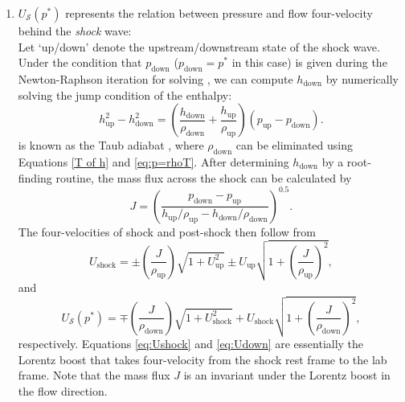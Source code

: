 \documentclass[twocolumn]{aastex63}
\begin{document}
\begin{enumerate}
\begin{enumerate}
          \item $U_{\mathscr{S}}(p^*)$ represents the relation between pressure and flow four-velocity behind the \emph{shock} wave:\\
          Let `up/down' denote the upstream/downstream state of the shock wave. Under the condition that $p_{\text{down}}$ ($p_{\text{down}}=p^{*}$ in this case) is given during the Newton-Raphson iteration for solving , we can compute $h_{\text{down}}$ by numerically solving the jump condition of the enthalpy:
          \begin{equation}
          h^2_{\text{up}}-h^2_{\text{down}}=\left(\frac{h_{\text{down}}}{\rho_{\text{down}}}+\frac{h_{\text{up}}}{\rho_{\text{up}}}\right)\left(p_{\text{up}}-p_{\text{down}}\right).
          \label{eq:TaubAdiabatic}
          \end{equation}
           is known as the Taub adiabat \citep{Taub}, where $\rho_{\text{down}}$ can be eliminated using Equations \eqref{T of h} and \eqref{eq:p=rhoT}. After determining $h_{\text{down}}$ by a root-finding routine, the mass flux across the shock can be calculated by
          \begin{equation} J=\left(\frac{p_{\text{down}}-p_{\text{up}}}{h_{\text{up}}/\rho_{\text{up}}-h_{\text{down}}/\rho_{\text{down}}}\right)^{0.5}.
          \label{eq:mass flux}
          \end{equation}
          The four-velocities of shock and post-shock then follow from
          \begin{equation}
          U_{\text{shock}}=\pm \left(\frac{J}{\rho_{\text{up}}}\right)\sqrt{1+U^2_{\text{up}}}\pm U_{\text{up}}\sqrt{1+\left(\frac{J}{\rho_{\text{up}}}\right)^2},
          \label{eq:Ushock}
          \end{equation}
          and
          \begin{equation}
          U_{\mathscr{S}}(p^{*})=\mp \left(\frac{J}{\rho_{\text{down}}}\right)\sqrt{1+U^2_{\text{shock}}}+U_{\text{shock}}\sqrt{1+\left(\frac{J}{\rho_{\text{down}}}\right)^2},
          \label{eq:Udown}
          \end{equation}
          respectively. Equations \eqref{eq:Ushock} and \eqref{eq:Udown} are essentially the Lorentz boost that takes four-velocity from the shock rest frame to the lab frame. Note that the mass flux $J$ is an invariant under the Lorentz boost in the flow direction.
          \end{enumerate}


\end{enumerate}
\end{document}
